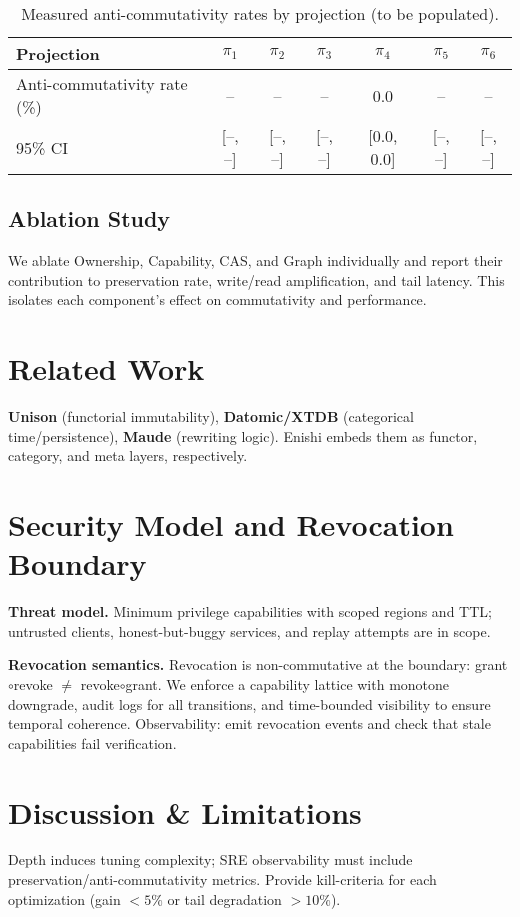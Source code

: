 \documentclass[10pt]{article}
\begin{document}
\begin{table}[h]
\centering
\small
\begin{tabular}{lcccccc}
\toprule
Projection & $\pi_1$ & $\pi_2$ & $\pi_3$ & $\pi_4$ & $\pi_5$ & $\pi_6$ \\
\midrule
Anti-commutativity rate (\%) & -- & -- & -- & 0.0 & -- & -- \\
95\% CI & [--, --] & [--, --] & [--, --] & [0.0, 0.0] & [--, --] & [--, --] \\
\bottomrule
\end{tabular}
\caption{Measured anti-commutativity rates by projection (to be populated).}
\label{tab:anti-measure}
\end{table}

\subsection{Ablation Study}
We ablate Ownership, Capability, CAS, and Graph individually and report their contribution to preservation rate, write/read amplification, and tail latency. This isolates each component's effect on commutativity and performance.

\section{Related Work}
\textbf{Unison} (functorial immutability), \textbf{Datomic/XTDB} (categorical time/persistence),
\textbf{Maude} (rewriting logic). Enishi embeds them as functor, category, and meta layers, respectively.

\section{Security Model and Revocation Boundary}\label{sec:security}
\textbf{Threat model.} Minimum privilege capabilities with scoped regions and TTL; untrusted clients, honest-but-buggy services, and replay attempts are in scope.

\textbf{Revocation semantics.} Revocation is non-commutative at the boundary: grant$\circ$revoke $\ne$ revoke$\circ$grant. We enforce a capability lattice with monotone downgrade, audit logs for all transitions, and time-bounded visibility to ensure temporal coherence. Observability: emit revocation events and check that stale capabilities fail verification.

\section{Discussion \& Limitations}
Depth induces tuning complexity; SRE observability must include preservation/anti-commutativity metrics.
Provide kill-criteria for each optimization (gain $<\!5\%$ or tail degradation $>\!10\%$).
\end{document}
